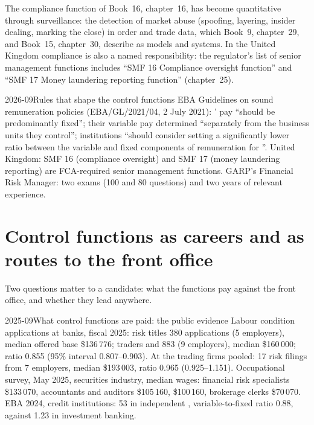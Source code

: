 The compliance function of Book~16, chapter~16, has become quantitative through surveillance: the detection of market
abuse (spoofing, layering, insider dealing, marking the close) in order and trade data, which Book~9, chapter~29, and
Book~15, chapter~30, describe as models and systems. In the United Kingdom compliance is also a named responsibility: the
regulator's list of senior management functions includes ``SMF 16 Compliance oversight function'' and ``SMF 17 Money
laundering reporting function'' (chapter~25).

\begin{dated}{2026-09}{Rules that shape the control functions}\label{dat:in:risk-operations-product-control-and-compliance:rules}
EBA Guidelines on sound remuneration policies (EBA/GL/2021/04, 2 July 2021): ' pay ``should be
predominantly fixed''; their variable pay determined ``separately from the business units they control''; institutions
``should consider setting a significantly lower ratio between the variable and fixed components of remuneration for
''. United Kingdom: SMF 16 (compliance oversight) and SMF 17 (money laundering reporting) are
FCA-required senior management functions. GARP's Financial Risk Manager: two exams (100 and 80 questions) and two years of
relevant experience.
\end{dated}

\section{Control functions as careers and as routes to the front office}

Two questions matter to a candidate: what the functions pay against the front office, and whether they lead anywhere.

\begin{dated}{2025-09}{What control functions are paid: the public evidence}\label{dat:in:risk-operations-product-control-and-compliance:pay}
Labour condition applications at banks, fiscal 2025: risk titles 380 applications (5 employers), median offered base
\$136\,776; traders and  883 (9 employers), median \$160\,000; ratio 0.855 (95\% interval
0.807--0.903). At the trading firms pooled: 17 risk filings from 7 employers, median \$193\,003, ratio 0.965
(0.925--1.151). Occupational survey, May 2025, securities industry, median wages: financial risk specialists \$133\,070,
accountants and auditors \$105\,160,  \$100\,160, brokerage clerks \$70\,070. EBA  2024,
credit institutions: 53 in independent , variable-to-fixed ratio 0.88, against 1.23 in investment
banking.
\end{dated}

